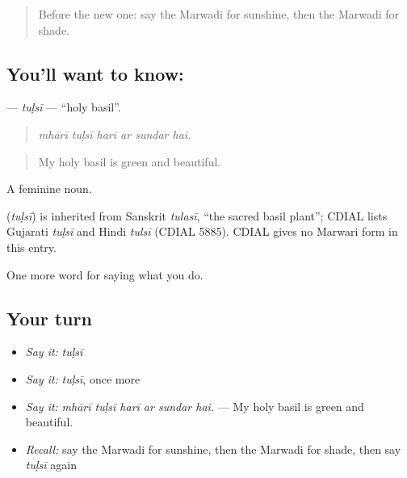 \begin{quote}
Before the new one: say the Marwadi for sunshine, then the Marwadi for shade.
\end{quote}

\subsection*{You'll want to know: }
\textbf{} — \emph{tuḷsī} — \textquotedblleft{}holy basil\textquotedblright{}.

\begin{quote}
     
\end{quote}

\begin{quote}
\emph{mhārī tuḷsī harī ar sundar hai.}
\end{quote}

\begin{quote}
My holy basil is green and beautiful.
\end{quote}

A feminine noun.

\begin{cousinweb}
\textbf{} (\emph{tuḷsī}) is inherited from Sanskrit \emph{tulasī}, \textquotedblleft{}the sacred basil plant\textquotedblright{}; CDIAL lists Gujarati \emph{tuḷsī} and Hindi \emph{tulsī} (CDIAL 5885). CDIAL gives no Marwari form in this entry.
\end{cousinweb}

\begin{grammarlens}[title={What you've built}]
One more word for saying what you do.
\end{grammarlens}

\subsection*{Your turn}
\begin{itemize}
\raggedright
  \item \emph{Say it:} \emph{tuḷsī}
  \item \emph{Say it:} \emph{tuḷsī}, once more
  \item \emph{Say it:} \emph{mhārī tuḷsī harī ar sundar hai.} — My holy basil is green and beautiful.
  \item \emph{Recall:} say the Marwadi for sunshine, then the Marwadi for shade, then say \emph{tuḷsī} again
\end{itemize}

